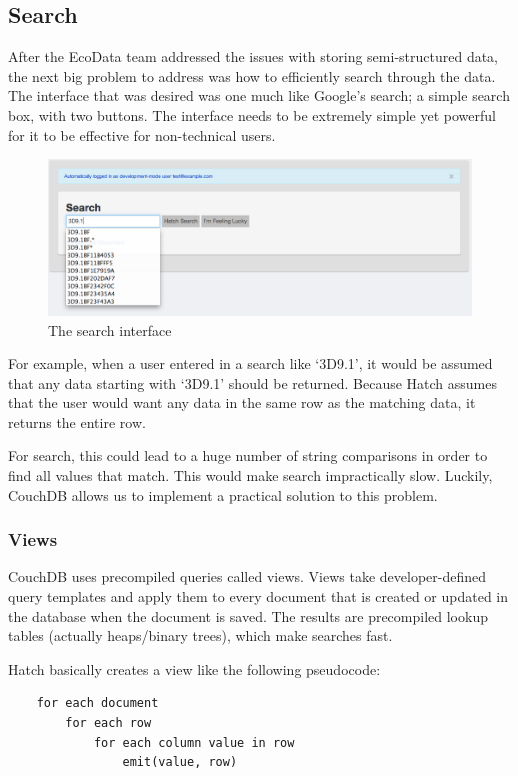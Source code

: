 \subsection{Search}
After the EcoData team addressed the issues with storing semi-structured data, the next 
big problem to address was how to efficiently search through the data. The interface 
that was desired was one much like Google's search; a simple search box, with two
buttons. The interface needs to be extremely simple yet powerful for it to be 
effective for non-technical users. 

\begin{figure}[h]
	\begin{center}
	\includegraphics[width=120mm]{images/search_ss1}
	\caption{The search interface} 
	\label{search_ss1}
	\end{center}
\end{figure}

For example, when a user entered in a search like `3D9.1', it would be assumed that 
any data starting with `3D9.1' should be returned. Because Hatch assumes that
the user would want any data in the same row as the matching data, it returns
the entire row. 

For search, this could lead to a huge number of string comparisons in order to find
all values that match. This would make search impractically slow. Luckily, CouchDB allows
us to implement a practical solution to this problem.

\subsubsection{Views}
CouchDB uses precompiled queries called views. Views take developer-defined
query templates and apply them to every document that is created or updated in the 
database when the document is saved. The results are precompiled lookup tables 
(actually heaps/binary trees), which make searches fast. 

Hatch basically creates a view like the following pseudocode:
\singlespacing
\begin{lstlisting}
	for each document
		for each row
			for each column value in row
				emit(value, row)
\end{lstlisting}
\doublespacing

